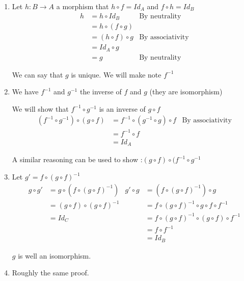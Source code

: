 \documentclass{article}
\theoremstyle{plain}
\begin{document}
  \begin{enumerate}
    \item Let $h : B \to A$ a morphism that $h \circ f = Id_A$ and
      $f \circ h = Id_B $
      \begin{align*}
        h &= h \circ Id_B & \text{By neutrality}\\
          &= h \circ (f \circ g) & \\
          &= (h \circ f) \circ g & \text{By associativity} \\
          &= Id_A \circ g & \\
          &= g & \text{By neutrality}
      \end{align*}

      We can say that $g$ is unique. We will make note $f^{-1}$

    \item We have $f^{-1}$ and $g^{-1}$ the inverse of $f$ and $g$ (they are
      isomorphism)

      We will show that $f^{-1} \circ g^{-1}$ is an inverse of $g \circ f$
      \begin{align*}
        (f^{-1} \circ g^{-1}) \circ (g \circ f) &=
        f^{-1} \circ (g^{-1} \circ g) \circ f & \text{By associativity} \\
        &= f^{-1} \circ f & \\
        &= Id_A &
      \end{align*}

      A similar reasoning can be used to show :$(g \circ f) \circ (f^{-1} \circ
      g^{-1}$

    \item Let $g' = f \circ (g \circ f)^{-1}$
      \begin{align*}
        g \circ g' &= g \circ (f \circ (g \circ f)^{-1}) &
        g' \circ g &= (f \circ (g \circ f)^{-1}) \circ g \\
        &= (g \circ f) \circ (g \circ f)^{-1} &
        &= f \circ (g \circ f)^{-1} \circ g \circ f \circ f^{-1} \\
        &= Id_C &
        &= f \circ (g \circ f)^{-1} \circ (g \circ f) \circ f^{-1} \\
        & &
        &= f \circ f^{-1} \\
        & &
        &= Id_B
      \end{align*}

      $g$ is well an isomorphism.

    \item Roughly the same proof.


\end{enumerate}
\end{document}
